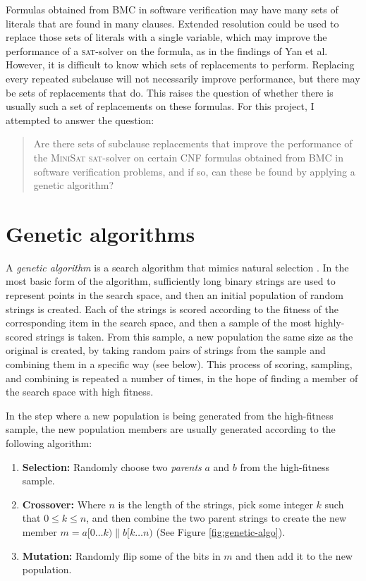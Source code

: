 \documentclass[proof,pdftex,11pt,a4,titlepage]{article}
\newcommand{\sat}{\textsc{sat}}
\begin{document}
Formulas obtained from BMC in software verification may have many sets of literals that are found in many clauses. Extended resolution could be used to replace those sets of literals with a single variable, which may improve the performance of a \sat{}-solver on the formula, as in the findings of Yan et al. However, it is difficult to know which sets of replacements to perform. Replacing every repeated subclause will not necessarily improve performance, but there may be sets of replacements that do. This raises the question of whether there is usually such a set of replacements on these formulas. For this project, I attempted to answer the question:
\begin{quote}
  Are there sets of subclause replacements that improve the performance of the \textsc{MiniSat} \sat{}-solver on certain CNF formulas obtained from BMC in software verification problems, and if so, can these be found by applying a genetic algorithm?
\end{quote}

\section{Genetic algorithms}
\label{sec:genetic}

A \emph{genetic algorithm} is a search algorithm that mimics natural selection  \cite{Goldberg:1989}. In the most basic form of the algorithm, sufficiently long binary strings are used to represent points in the search space, and then an initial population of random strings is created. Each of the strings is scored according to the fitness of the corresponding item in the search space, and then a sample of the most highly-scored strings is taken. From this sample, a new population the same size as the original is created, by taking random pairs of strings from the sample and combining them in a specific way (see below). This process of scoring, sampling, and combining is repeated a number of times, in the hope of finding a member of the search space with high fitness.

In the step where a new population is being generated from the high-fitness sample, the new population members are usually generated according to the following algorithm:

\begin{enumerate}
  \item {\bf Selection:} Randomly choose two \emph{parents} $a$ and $b$ from the high-fitness sample.
  \item {\bf Crossover:} Where $n$ is the length of the strings, pick some integer $k$ such that $0 \leq k \leq n$, and then combine the two parent strings to create the new member $m = a[0 \ldots k) \parallel b[k \ldots n)$ (See Figure \ref{fig:genetic-algo}).
  \item {\bf Mutation:} Randomly flip some of the bits in $m$ and then add it to the new population.
\end{enumerate}
\end{document}
